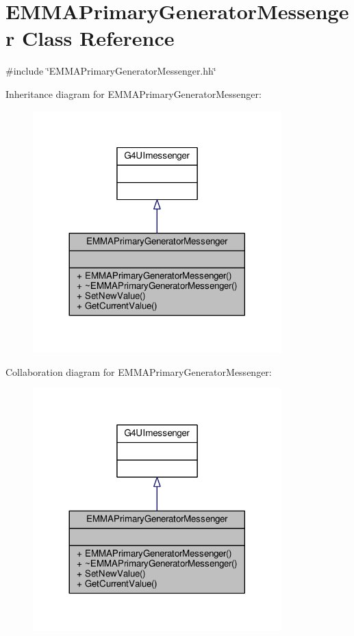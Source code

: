 \hypertarget{classEMMAPrimaryGeneratorMessenger}{}\section{E\+M\+M\+A\+Primary\+Generator\+Messenger Class Reference}
\label{classEMMAPrimaryGeneratorMessenger}


{\ttfamily \#include \char`\"{}E\+M\+M\+A\+Primary\+Generator\+Messenger.\+hh\char`\"{}}



Inheritance diagram for E\+M\+M\+A\+Primary\+Generator\+Messenger\+:
\nopagebreak
\begin{figure}[H]
\begin{center}
\leavevmode
\includegraphics[width=272pt]{classEMMAPrimaryGeneratorMessenger__inherit__graph}
\end{center}
\end{figure}


Collaboration diagram for E\+M\+M\+A\+Primary\+Generator\+Messenger\+:
\nopagebreak
\begin{figure}[H]
\begin{center}
\leavevmode
\includegraphics[width=272pt]{classEMMAPrimaryGeneratorMessenger__coll__graph}
\end{center}
\end{figure}
